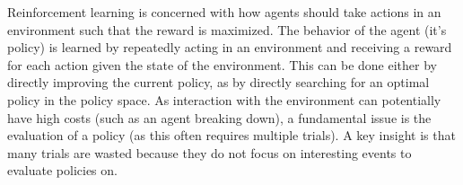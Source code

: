 


Reinforcement learning is concerned with how agents should take actions in an environment such that the reward is maximized. The behavior of the agent (it's policy) is learned by repeatedly acting in an environment and receiving a reward for each action given the state of the environment. This can be done either by directly improving the current policy, as by directly searching for an optimal policy in the policy space. As interaction with the environment can potentially have high costs (such as an agent breaking down), a fundamental issue is the evaluation of a policy (as this often requires multiple trials). A key insight is that many trials are wasted because they do not focus on interesting events to evaluate policies on. 

